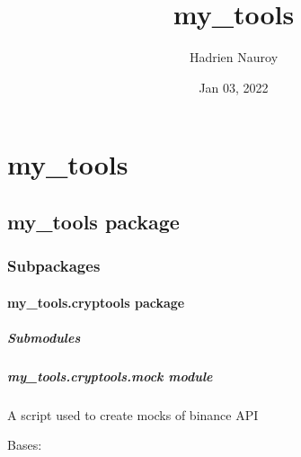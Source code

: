 \documentclass[letterpaper,10pt,english]{sphinxmanual}
\title{my\_tools}
\date{Jan 03, 2022}
\author{Hadrien Nauroy}
\begin{document}
\pagestyle{empty}
\sphinxmaketitle
\pagestyle{plain}
\sphinxtableofcontents
\pagestyle{normal}
\label{\detokenize{index::doc}}



\chapter{my\_tools}
\label{\detokenize{modules:my-tools}}\label{\detokenize{modules::doc}}

\section{my\_tools package}
\label{\detokenize{my_tools:my-tools-package}}\label{\detokenize{my_tools::doc}}

\subsection{Subpackages}
\label{\detokenize{my_tools:subpackages}}

\subsubsection{my\_tools.cryptools package}
\label{\detokenize{my_tools.cryptools:my-tools-cryptools-package}}\label{\detokenize{my_tools.cryptools::doc}}

\paragraph{Submodules}
\label{\detokenize{my_tools.cryptools:submodules}}

\paragraph{my\_tools.cryptools.mock module}
\label{\detokenize{my_tools.cryptools:module-my_tools.cryptools.mock}}\label{\detokenize{my_tools.cryptools:my-tools-cryptools-mock-module}}
\sphinxAtStartPar
A script used to create mocks of binance API

\begin{fulllineitems}
\label{\detokenize{my_tools.cryptools:my_tools.cryptools.mock.SizeError}}
\sphinxAtStartPar
Bases: 

\end{fulllineitems}
\end{document}
